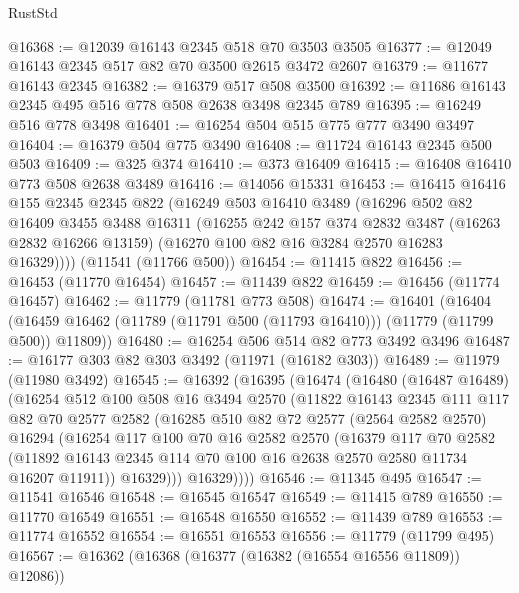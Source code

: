 \begin{lexlean}{RustStd}
\begin{coremodule}
@16368 := @12039 @16143 @2345 @518 @70 @3503 @3505
@16377 := @12049 @16143 @2345 @517 @82 @70 @3500 @2615 @3472 @2607
@16379 := @11677 @16143 @2345
@16382 := @16379 @517 @508 @3500
@16392 := @11686 @16143 @2345 @495 @516 @778 @508 @2638 @3498 @2345 @789
@16395 := @16249 @516 @778 @3498
@16401 := @16254 @504 @515 @775 @777 @3490 @3497
@16404 := @16379 @504 @775 @3490
@16408 := @11724 @16143 @2345 @500 @503
@16409 := @325 @374
@16410 := @373 @16409
@16415 := @16408 @16410 @773 @508 @2638 @3489
@16416 := @14056 @15331
@16453 := @16415
    @16416
    @155
    @2345
    @2345
    @822
    (@16249
      @503
      @16410
      @3489
      (@16296
        @502
        @82
        @16409
        @3455
        @3488
        @16311
        (@16255
          @242
          @157
          @374
          @2832
          @3487
          (@16263 @2832 @16266 @13159)
          (@16270 @100 @82 @16 @3284 @2570 @16283 @16329))))
    (@11541 (@11766 @500))
@16454 := @11415 @822
@16456 := @16453 (@11770 @16454)
@16457 := @11439 @822
@16459 := @16456 (@11774 @16457)
@16462 := @11779 (@11781 @773 @508)
@16474 := @16401
    (@16404 (@16459 @16462 (@11789 (@11791 @500 (@11793 @16410))) (@11779 (@11799 @500)) @11809))
@16480 := @16254 @506 @514 @82 @773 @3492 @3496
@16487 := @16177 @303 @82 @303 @3492 (@11971 (@16182 @303))
@16489 := @11979 (@11980 @3492)
@16545 := @16392
    (@16395
      (@16474
        (@16480
          (@16487 @16489)
          (@16254
            @512
            @100
            @508
            @16
            @3494
            @2570
            (@11822
              @16143
              @2345
              @111
              @117
              @82
              @70
              @2577
              @2582
              (@16285
                @510
                @82
                @72
                @2577
                (@2564 @2582 @2570)
                @16294
                (@16254
                  @117
                  @100
                  @70
                  @16
                  @2582
                  @2570
                  (@16379
                    @117
                    @70
                    @2582
                    (@11892 @16143 @2345 @114 @70 @100 @16 @2638 @2570 @2580 @11734 @16207 @11911))
                  @16329)))
            @16329))))
@16546 := @11345 @495
@16547 := @11541 @16546
@16548 := @16545 @16547
@16549 := @11415 @789
@16550 := @11770 @16549
@16551 := @16548 @16550
@16552 := @11439 @789
@16553 := @11774 @16552
@16554 := @16551 @16553
@16556 := @11779 (@11799 @495)
@16567 := @16362
    (@16368 (@16377 (@16382 (@16554 @16556 @11809)) @12086))

\end{coremodule}
\end{lexlean}
